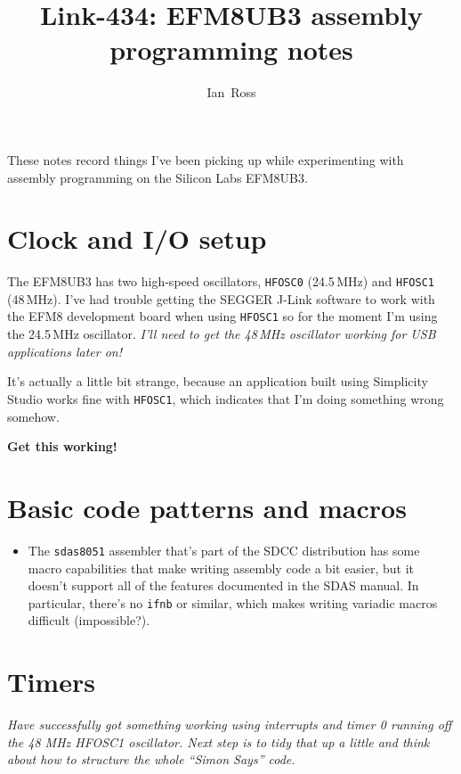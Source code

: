 \documentclass[a4paper,11pt]{article}
\title{Link-434: EFM8UB3 assembly programming notes}
\author{Ian~Ross}
\begin{document}
\maketitle

These notes record things I've been picking up while experimenting
with assembly programming on the Silicon Labs EFM8UB3.

\section{Clock and I/O setup}

The EFM8UB3 has two high-speed oscillators, \texttt{HFOSC0}
(24.5\,MHz) and \texttt{HFOSC1} (48\,MHz). I've had trouble getting
the SEGGER J-Link software to work with the EFM8 development board
when using \texttt{HFOSC1} so for the moment I'm using the 24.5\,MHz
oscillator. \emph{I'll need to get the 48\,MHz oscillator working for
USB applications later on!}

It's actually a little bit strange, because an application built using
Simplicity Studio works fine with \texttt{HFOSC1}, which indicates
that I'm doing something wrong somehow.

\textbf{Get this working!}

\section{Basic code patterns and macros}

\begin{itemize}
  \item{The \texttt{sdas8051} assembler that's part of the SDCC
    distribution has some macro capabilities that make writing
    assembly code a bit easier, but it doesn't support all of the
    features documented in the SDAS manual. In particular, there's no
    \texttt{ifnb} or similar, which makes writing variadic macros
    difficult (impossible?).}
\end{itemize}

\section{Timers}

\emph{Have successfully got something working using interrupts and
timer 0 running off the 48 MHz HFOSC1 oscillator. Next step is to tidy
that up a little and think about how to structure the whole ``Simon
Says'' code.}
\end{document}

